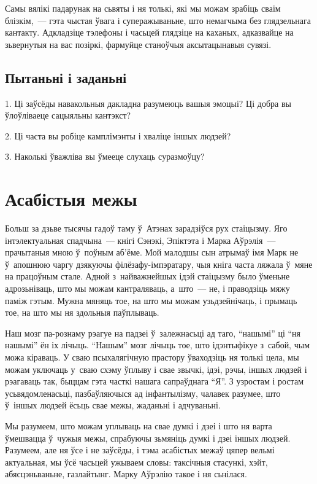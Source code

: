 Самы вялікі падарунак на сьвяты і ня толькі, які мы можам зрабіць сваім блізкім,~--- гэта чыстая ўвага і суперажываньне, што немагчыма без глядзельнага кантакту. Адкладзіце тэлефоны і часьцей глядзіце на каханых, адказвайце на зьвернутыя на вас позіркі, фармуйце станоўчыя аксытацынавыя сувязі.

\subsection*{Пытаньні і заданьні}

1. Ці заўсёды навакольныя дакладна разумеюць вашыя эмоцыі? Ці добра вы ўлоўліваеце сацыяльны кантэкст?

2. Ці часта вы робіце камплімэнты і хваліце іншых людзей?

3. Наколькі ўважліва вы ўмееце слухаць суразмоўцу?


\section{Асабістыя межы}

Больш за дзьве тысячы гадоў таму ў~Атэнах зарадзіўся рух стаіцызму. Яго інтэлектуальная спадчына~--- кнігі Сэнэкі, Эпіктэта і Марка Аўрэлія~--- прачытаныя мною ў~поўным аб'ёме. Мой малодшы сын атрымаў імя Марк не ў~апошнюю чаргу дзякуючы філёзафу-імпэратару, чыя кніга часта ляжала ў~мяне на працоўным стале. Адной з~найважнейшых ідэй стаіцызму было ўменьне адрозьніваць, што мы можам кантраляваць, а~што~--- не, і праводзіць мяжу паміж гэтым. Мужна мяняць тое, на што мы можам узьдзейнічаць, і прымаць тое, на што мы ня здольныя паўплываць.

Наш мозг па-рознаму рэагуе на падзеі ў~залежнасьці ад таго, ``нашымі'' ці ``ня нашымі'' ён іх лічыць. ``Нашым'' мозг лічыць тое, што ідэнтыфікуе з~сабой, чым можа кіраваць. У сваю псыхалягічную прастору ўваходзіць ня толькі цела, мы можам уключаць у~сваю схэму ўплыву і свае звычкі, ідэі, рэчы, іншых людзей і рэагаваць так, быццам гэта часткі нашага сапраўднага ``Я''. З узростам і ростам усьвядомленасьці, пазбаўляючыся ад інфантылізму, чалавек разумее, што ў~іншых людзей ёсьць свае межы, жаданьні і адчуваньні. 

Мы разумеем, што можам уплываць на свае думкі і дзеі і што ня варта ўмешвацца ў~чужыя межы, спрабуючы зьмяніць думкі і дзеі іншых людзей. Разумеем, але ня ўсе і не заўсёды, і тэма асабістых межаў цяпер вельмі актуальная, мы ўсё часьцей ужываем словы: таксічныя стасункі, хэйт, абясцэньваньне, газлайтынг. Марку Аўрэлію такое і ня сьнілася.


